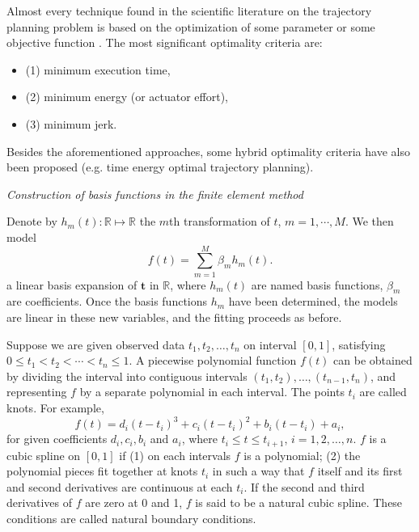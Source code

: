 Almost every technique found in the scientific literature on the trajectory planning problem is based on the optimization of some parameter or some objective function \cite{gasparetto2007new}. The most significant optimality criteria are: 
\begin{itemize}
\item (1) minimum execution time,
\item (2) minimum energy (or actuator effort),
\item (3) minimum jerk.
\end{itemize}
Besides the aforementioned approaches, some hybrid optimality criteria have also been proposed (e.g. time energy optimal trajectory planning).


\cite{mitchell1972construction} \textit{Construction of basis functions in the finite element method}

Denote by $h_m(t):\mathbb{R} \mapsto \mathbb{R}$ the $m$th transformation of $t$, $m =1, \cdots ,M$. We then model
\begin{equation}\label{introfbasis}
f(t) =\sum_{m=1}^{M}\beta_mh_m(t).
\end{equation}
a linear basis expansion of $\mathbf{t}$ in $\mathbb{R}$, where $h_m(t)$ are named basis functions, $\beta_m$ are coefficients. Once the basis functions $h_m$ have been determined, the models are linear in these new variables, and the fitting proceeds as before.

Suppose we are given observed data $t_1,t_2, \ldots, t_n$ on interval $[0,1]$, satisfying $0\leq t_1< t_2 < \cdots <t_n \leq 1$. A piecewise polynomial function $f(t)$ can be obtained by dividing the interval into contiguous
intervals $(t_1,t_2),\ldots,(t_{n-1},t_n)$, and representing $f$ by a separate polynomial in each interval. The points $t_i$ are called knots. For example,
\begin{equation}
f(t)=d_i(t-t_i)^3+c_i(t-t_i)^2+b_i(t-t_i)+a_i,
\end{equation}
for given coefficients $d_i, c_i, b_i$ and $a_i$, where $t_i\leq t\leq t_{i+1}$, $i=1,2,\ldots,n$. $f$ is a cubic spline on $[0,1]$ if (1) on each intervals $f$ is a polynomial; (2) the polynomial pieces fit together at knots $t_i$ in such a way that $f$ itself and its first and second derivatives are continuous at each $t_i$. If the second and third derivatives of $f$ are zero at 0 and 1, $f$ is said to be a natural cubic spline. These conditions are called natural boundary conditions.

